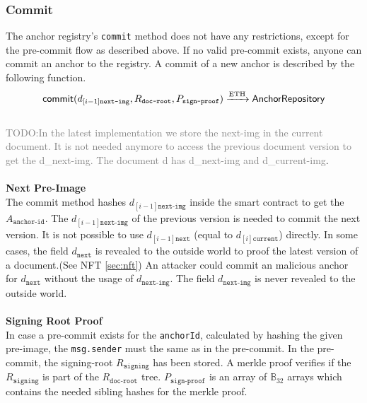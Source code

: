\subsubsection{Commit}
The anchor registry's \texttt{commit} method does not have any restrictions, except for the pre-commit flow as described above. If no valid pre-commit exists, anyone can commit an anchor to the registry. A commit of a new anchor is described by the following function. 
\begin{equation}\\
    \mathsf{commit}(d_{[i-1]\texttt{next-img}},R_{\texttt{doc-root}},P_{\texttt{sign-proof}}) \xrightarrow[]{\text{ETH}} \mathsf{AnchorRepository}
\end{equation}\\
\textcolor{gray}{TODO:In the latest implementation we store the next-img in the current document.  It is not needed anymore to access the previous document version to get the d\_next-img. The document d has d\_next-img and d\_current-img}.\\\\
\textbf{Next Pre-Image }\\
The commit method hashes $d_{[i−1]\texttt{next-img}}$ inside the smart contract to get the $A_{\texttt{anchor-id}}$. The $d_{[i−1]\texttt{next-img}}$ of the previous version is needed to commit the next version. It is not possible to use $d_{[i−1]\texttt{next}}$ (equal to $d_{[i]\texttt{current}}$) directly. In some cases, the field  $d_{\texttt{next}}$ is revealed to the outside world to proof the latest version of a document.(See NFT \ref{sec:nft}) An attacker could commit an malicious anchor for $d_{\texttt{next}}$ without the usage of $d_{\texttt{next-img}}$. The field $d_{\texttt{next-img}}$ is never revealed to the outside world. \\
\\
\textbf{Signing Root Proof }\\
In case a pre-commit exists for the \texttt{anchorId}, calculated by hashing the given pre-image, the \texttt{msg.sender} must the same as in the pre-commit. In the pre-commit, the signing-root $R_{\texttt{signing}}$ has been stored. A merkle proof verifies if the $R_{\texttt{signing}}$ is part of the $R_{\texttt{doc-root}}$ tree. $P_{\texttt{sign-proof}}$ is an array of $\mathbb{B}_{32}$ arrays which contains the needed sibling hashes for the merkle proof. 





